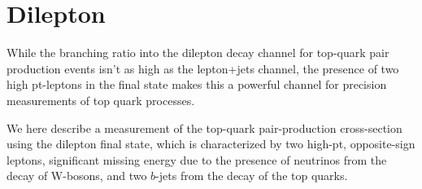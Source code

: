 
\newcommand{\dr} {\ensuremath{\Delta R({\rm lepton},{\rm jet})}}
\newcommand{\pmasym}[2]{^{+#1}_{-#2}}
\newcommand{\sigmattbar}{\ensuremath{\sigma_{\ttbar}}}
\newcommand{\sigmaz}{\ensuremath{\sigma_{\Zboson}}}
\newcommand{\lumitot}{\mbox{0.70~fb$^{-1}$}}
\newcommand{\lumitotpm}{\mbox{0.70$\pm$0.03~fb$^{-1}$}}

\newcommand{\xsectot}{171}
\newcommand{\xsecstat}{\pm 6}
\newcommand{\xsecsyst}{\pmasym{16}{14}}
\newcommand{\xseclumi}{\pm 8}

\newcommand{\xsecbtot}{177}
\newcommand{\xsecbstat}{\pm 6}
\newcommand{\xsecbsyst}{\pmasym {17}{14}}
\newcommand{\xsecblumi}{\pmasym {8}{7}}


\newcommand{\AKT}{anti-k$_{t}$}
\def\lum{{\ensuremath{\cal L}}}
\def \intlum {\int {\cal L} dt}
\def\MCatNLO{{\sc MC@NLO}}
\def\FigMerit{F_M}
\def\JetProb{{\sc JetProb}}
\def\SVZero{{\sc SV0}}
\def\Nn{N_n}  %
\def\Zg{\Zboson/\gamma^{*}}
\def\GEANT{{\sc GEANT4}}

\section{Dilepton}


While the branching ratio into the dilepton decay channel for top-quark pair production events
isn't as high as the lepton+jets channel, the presence of two high pt-leptons in the final state
makes this a powerful channel for precision measurements of top quark processes.

We here describe a measurement of the top-quark pair-production cross-section using the
dilepton final state, which is characterized by two high-pt, opposite-sign leptons,
significant missing energy due to the presence of neutrinos from the decay of W-bosons,
and two $b$-jets from the decay of the top quarks.




